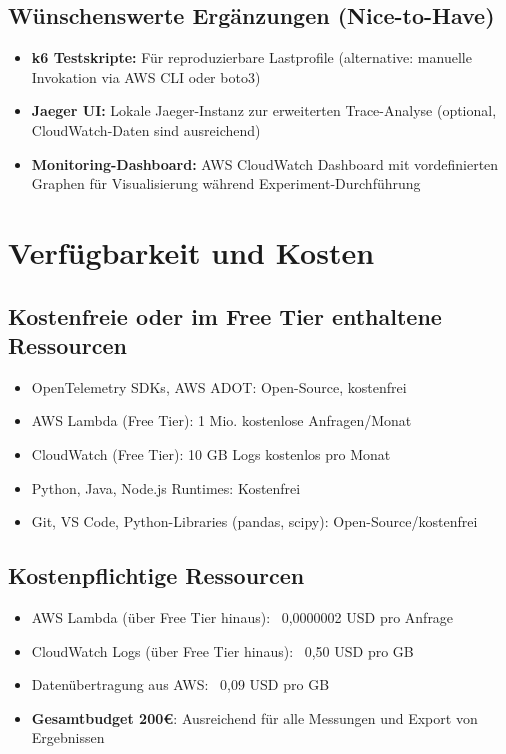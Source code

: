 \subsection{Wünschenswerte Ergänzungen (Nice-to-Have)}

\begin{itemize}
    \item \textbf{k6 Testskripte:} Für reproduzierbare Lastprofile (alternative: manuelle Invokation via AWS CLI oder boto3)
    \item \textbf{Jaeger UI:} Lokale Jaeger-Instanz zur erweiterten Trace-Analyse (optional, CloudWatch-Daten sind ausreichend)
    \item \textbf{Monitoring-Dashboard:} AWS CloudWatch Dashboard mit vordefinierten Graphen für Visualisierung während Experiment-Durchführung
\end{itemize}



\section{Verfügbarkeit und Kosten}

\subsection{Kostenfreie oder im Free Tier enthaltene Ressourcen}

\begin{itemize}
    \item OpenTelemetry SDKs, AWS ADOT: Open-Source, kostenfrei
    \item AWS Lambda (Free Tier): 1 Mio. kostenlose Anfragen/Monat
    \item CloudWatch (Free Tier): 10 GB Logs kostenlos pro Monat
    \item Python, Java, Node.js Runtimes: Kostenfrei
    \item Git, VS Code, Python-Libraries (pandas, scipy): Open-Source/kostenfrei
\end{itemize}

\subsection{Kostenpflichtige Ressourcen}

\begin{itemize}
    \item AWS Lambda (über Free Tier hinaus): ~0,0000002 USD pro Anfrage
    \item CloudWatch Logs (über Free Tier hinaus): ~0,50 USD pro GB
    \item Datenübertragung aus AWS: ~0,09 USD pro GB
    \item \textbf{Gesamtbudget 200€}: Ausreichend für alle Messungen und Export von Ergebnissen
\end{itemize}

